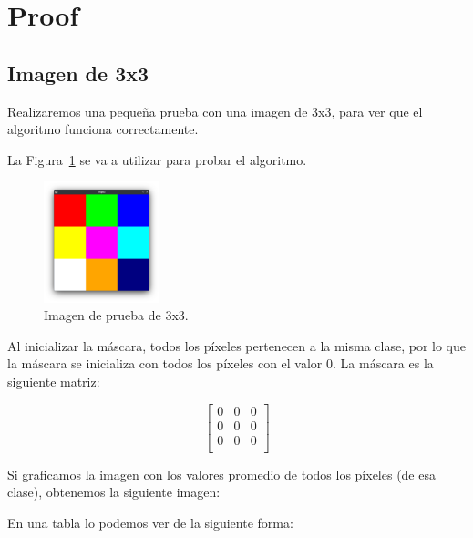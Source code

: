 \section{Proof}\label{sec:proof}

\subsection{Imagen de 3x3}\label{subsec:imagen-de-3x3}

Realizaremos una pequeña prueba con una imagen de 3x3, para ver que el algoritmo funciona correctamente.

La Figura~\ref{fig:test_img_3x3} se va a utilizar para probar el algoritmo.

\begin{figure}
    \centering
    \includegraphics[width=0.3\textwidth]{./latex/img/original}
    \caption{\label{fig:test_img_3x3}Imagen de prueba de 3x3.}
\end{figure}

Al inicializar la máscara, todos los píxeles pertenecen a la misma clase, por lo que la máscara se inicializa con todos los píxeles con el valor 0.
La máscara es la siguiente matriz:

\begin{equation*}
    \begin{bmatrix}
        0 & 0 & 0 \\
        0 & 0 & 0 \\
        0 & 0 & 0 \\
    \end{bmatrix}
\end{equation*}

Si graficamos la imagen con los valores promedio de todos los píxeles (de esa clase), obtenemos la siguiente imagen:

En una tabla lo podemos ver de la siguiente forma:


